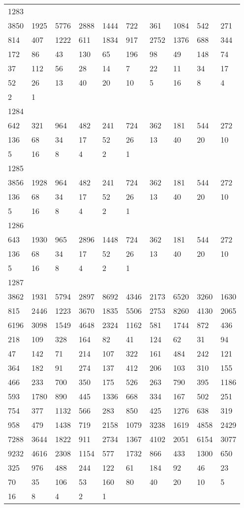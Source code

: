 \begin{longtable}{*{10}{l}}
1283&&&&&&&&&\\
3850& 1925& 5776& 2888& 1444& 722& 361& 1084& 542& 271\\
814& 407& 1222& 611& 1834& 917& 2752& 1376& 688& 344\\
172& 86& 43& 130& 65& 196& 98& 49& 148& 74\\
37& 112& 56& 28& 14& 7& 22& 11& 34& 17\\
52& 26& 13& 40& 20& 10& 5& 16& 8& 4\\
2& 1& \\

1284&&&&&&&&&\\
642& 321& 964& 482& 241& 724& 362& 181& 544& 272\\
136& 68& 34& 17& 52& 26& 13& 40& 20& 10\\
5& 16& 8& 4& 2& 1& \\

1285&&&&&&&&&\\
3856& 1928& 964& 482& 241& 724& 362& 181& 544& 272\\
136& 68& 34& 17& 52& 26& 13& 40& 20& 10\\
5& 16& 8& 4& 2& 1& \\

1286&&&&&&&&&\\
643& 1930& 965& 2896& 1448& 724& 362& 181& 544& 272\\
136& 68& 34& 17& 52& 26& 13& 40& 20& 10\\
5& 16& 8& 4& 2& 1& \\

1287&&&&&&&&&\\
3862& 1931& 5794& 2897& 8692& 4346& 2173& 6520& 3260& 1630\\
815& 2446& 1223& 3670& 1835& 5506& 2753& 8260& 4130& 2065\\
6196& 3098& 1549& 4648& 2324& 1162& 581& 1744& 872& 436\\
218& 109& 328& 164& 82& 41& 124& 62& 31& 94\\
47& 142& 71& 214& 107& 322& 161& 484& 242& 121\\
364& 182& 91& 274& 137& 412& 206& 103& 310& 155\\
466& 233& 700& 350& 175& 526& 263& 790& 395& 1186\\
593& 1780& 890& 445& 1336& 668& 334& 167& 502& 251\\
754& 377& 1132& 566& 283& 850& 425& 1276& 638& 319\\
958& 479& 1438& 719& 2158& 1079& 3238& 1619& 4858& 2429\\
7288& 3644& 1822& 911& 2734& 1367& 4102& 2051& 6154& 3077\\
9232& 4616& 2308& 1154& 577& 1732& 866& 433& 1300& 650\\
325& 976& 488& 244& 122& 61& 184& 92& 46& 23\\
70& 35& 106& 53& 160& 80& 40& 20& 10& 5\\
16& 8& 4& 2& 1& \\


\end{longtable}
